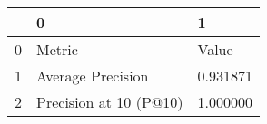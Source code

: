 \begin{tabular}{lll}
\toprule
 & 0 & 1 \\
\midrule
0 & Metric & Value \\
1 & Average Precision & 0.931871 \\
2 & Precision at 10 (P@10) & 1.000000 \\
\bottomrule
\end{tabular}
